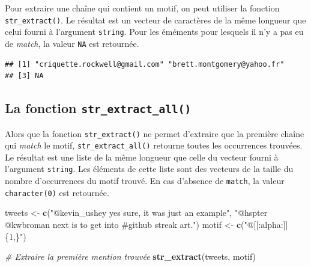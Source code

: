 \documentclass[
  11pt,
]{book}
\newenvironment{Shaded}{\begin{snugshade}}{\end{snugshade}}
\newcommand{\CommentTok}[1]{\textcolor[rgb]{0.56,0.35,0.01}{\textit{#1}}}
\newcommand{\DataTypeTok}[1]{\textcolor[rgb]{0.13,0.29,0.53}{#1}}
\newcommand{\KeywordTok}[1]{\textcolor[rgb]{0.13,0.29,0.53}{\textbf{#1}}}
\newcommand{\NormalTok}[1]{#1}
\newcommand{\StringTok}[1]{\textcolor[rgb]{0.31,0.60,0.02}{#1}}
\numberwithin{equation}{section}
\numberwithin{countremarque}{section}
\begin{document}
Pour extraire une chaîne qui contient un motif, on peut utiliser la fonction \texttt{str\_extract()}. Le résultat est un vecteur de caractères de la même longueur que celui fourni à l'argument \texttt{string}. Pour les éméments pour lesquels il n'y a pas eu de \emph{match}, la valeur \texttt{NA} est retournée.

\begin{Shaded}
\end{Shaded}

\begin{lstlisting}
## [1] "criquette.rockwell@gmail.com" "brett.montgomery@yahoo.fr"   
## [3] NA
\end{lstlisting}

\hypertarget{manip_regex_stringr_extract_all}{%
\subsection{\texorpdfstring{La fonction \texttt{str\_extract\_all()}}{La fonction str\_extract\_all()}}\label{manip_regex_stringr_extract_all}}

Alors que la fonction \texttt{str\_extract()} ne permet d'extraire que la première chaîne qui \emph{match} le motif, \texttt{str\_extract\_all()} retourne toutes les occurrences trouvées. Le résultat est une liste de la même longueur que celle du vecteur fourni à l'argument \texttt{string}. Les éléments de cette liste sont des vecteurs de la taille du nombre d'occurrences du motif trouvé. En cas d'absence de \texttt{match}, la valeur \texttt{character(0)} est retournée.

\begin{Shaded}
\begin{Highlighting}[]
\NormalTok{tweets \textless{}{-}}\StringTok{ }\KeywordTok{c}\NormalTok{(}\StringTok{"@kevin\_ushey yes sure, it was just an example"}\NormalTok{,}
            \StringTok{"@hspter @kwbroman next is to get into \#github streak art."}\NormalTok{)}
\NormalTok{motif \textless{}{-}}\StringTok{ }\KeywordTok{c}\NormalTok{(}\StringTok{"@[[:alpha:]]\{1,\}"}\NormalTok{)}

\CommentTok{\# Extraire la première mention trouvée}
\KeywordTok{str\_extract}\NormalTok{(tweets, motif)}
\end{Highlighting}
\end{Shaded}
\end{document}
